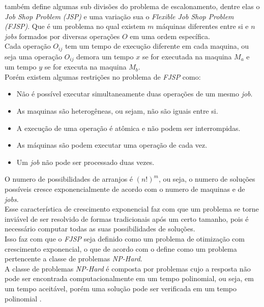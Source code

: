 \citeauthor{Bagchi1999} também define algumas sub divisões do problema de escalonamento, dentre elas o \textit{Job Shop Problem} \textit{(JSP)} e uma variação sua o \textit{Flexible Job Shop Problem} \textit{(FJSP)}. 
Que é um problema no qual existem $m$ máquinas diferentes entre si e $n$ \textit{jobs} formados por diversas operações $O$ em uma ordem específica.\\
Cada operação $O_{ij}$ tem um tempo de execução diferente em cada maquina, ou seja uma operação 
$O_{ij}$ demora um tempo $x$ se for executada na maquina $M_a$ e um tempo $y$ se for executa na maquina $M_b$.\\
Porém existem algumas restrições no problema de \textit{FJSP} como:
\begin{itemize}
    \item Não é possível executar simultaneamente duas operações de um mesmo \textit{job}.
    \item As maquinas são heterogêneas, ou sejam, não são iguais entre si.
    \item A execução de uma operação é atômica e não podem ser interrompidas.
    \item As máquinas são podem executar uma operação de cada vez.
    \item Um \textit{job} não pode ser processado duas vezes.
\end{itemize}

O numero de possibilidades de arranjos é $(n!)^m$, ou seja, o numero de soluções possíveis cresce exponencialmente de acordo com o numero de maquinas e de \textit{jobs}.\\
Esse característica de crescimento exponencial faz com que um problema se torne inviável de ser resolvido de formas tradicionais após um certo tamanho, pois é necessário computar todas as suas possibilidades de soluções.\\
Isso faz com que o \textit{FJSP} seja definido como um problema de otimização com crescimento exponencial, o que de acordo com \citeauthor{Eswaramurthy2008} o define como um problema pertencente a classe de problemas \textit{NP-Hard}.\\
A classe de problemas \textit{NP-Hard} é composta por problemas cujo a resposta não pode ser encontrada computacionalmente em um tempo polinomial, ou seja, em um tempo aceitável, porém uma solução pode ser verificada em um tempo polinomial \cite{Eswaramurthy2008}.\\



